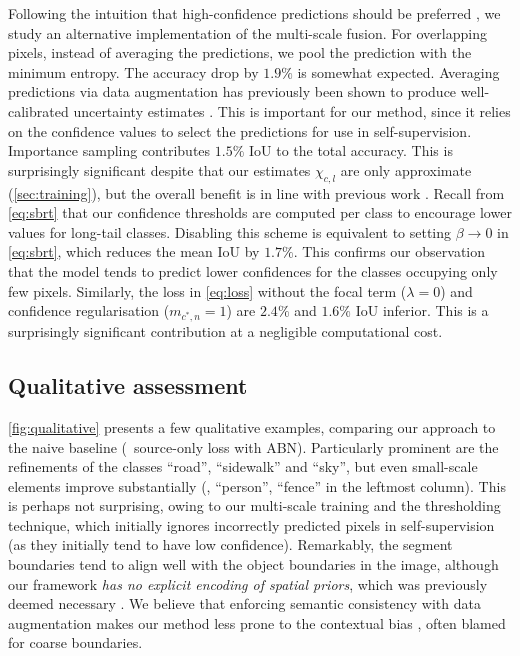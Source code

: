 Following the intuition that high-confidence predictions should be preferred \cite{subhani2020learning}, we study an alternative implementation of the multi-scale fusion.
For overlapping pixels, instead of averaging the predictions, we pool the prediction with the minimum entropy.
The accuracy drop by $1.9\%$ is somewhat expected.
Averaging predictions via data augmentation has previously been shown to produce well-calibrated uncertainty estimates \cite{ayhan2018test}.
This is important for our method, since it relies on the confidence values to select the predictions for use in self-supervision.
Importance sampling contributes $1.5 \%$ IoU to the total accuracy.
This is surprisingly significant despite that our estimates $\chi_{c,l}$ are only approximate (\cf \cref{sec:training}), but the overall benefit is in line with previous work \cite{GuptaDG19}.
Recall from \cref{eq:sbrt} that our confidence thresholds are computed per class to encourage lower values for long-tail classes.
Disabling this scheme is equivalent to setting $\beta \rightarrow 0$ in \cref{eq:sbrt}, which reduces the mean IoU by $1.7 \%$.
This confirms our observation that the model tends to predict lower confidences for the classes occupying only few pixels.
Similarly, the loss in \cref{eq:loss} without the focal term ($\lambda = 0$) and confidence regularisation ($m_{c^\ast\!,n} = 1$) are $2.4 \%$ and $1.6 \%$ IoU inferior.
This is a surprisingly significant contribution at a negligible computational cost.

\subsection{Qualitative assessment}
\cref{fig:qualitative} presents a few qualitative examples, comparing our approach to the naive baseline (\ie~source-only loss with ABN).
Particularly prominent are the refinements of the classes ``road'', ``sidewalk'' and ``sky'', but even small-scale elements improve substantially (\eg, ``person'', ``fence'' in the leftmost column).
This is perhaps not surprising, owing to our multi-scale training and the thresholding technique, which initially ignores incorrectly predicted pixels in self-supervision (as they initially tend to have low confidence).
Remarkably, the segment boundaries tend to align well with the object boundaries in the image, although our framework \emph{has no explicit encoding of spatial priors}, which was previously deemed necessary \cite{Chen0G18,TsaiSSC19,ZhangDG17,ZhangQYNL020}.
We believe that enforcing semantic consistency with data augmentation makes our method less prone to the contextual bias \cite{ShettySF19}, often blamed for coarse boundaries.
